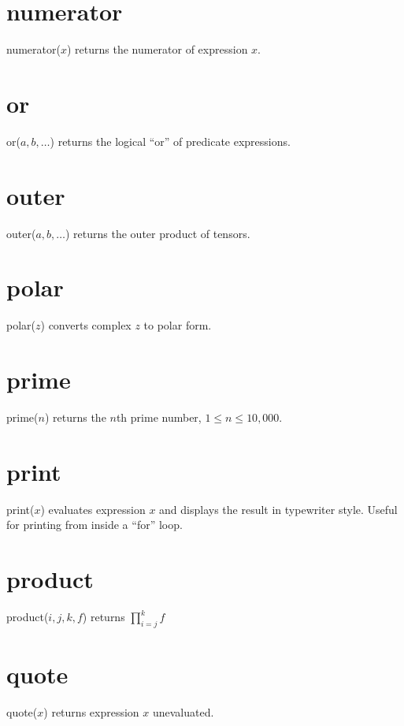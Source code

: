 \documentclass[12pt,openany]{report}
\begin{document}
\section*{numerator}
numerator($x$) returns the numerator of expression $x$.

\section*{or}
or($a,b,\ldots$) returns the logical ``or'' of predicate expressions.

\section*{outer}
outer($a,b,\ldots$) returns the outer product of tensors.

\section*{polar}
polar($z$) converts complex $z$ to polar form.

\section*{prime}
prime($n$) returns the $n$th prime number, $1\le n\le10{,}000$.

\section*{print}
print($x$) evaluates expression $x$ and displays the result in typewriter style.
Useful for printing from inside a ``for'' loop.

\section*{product}
product($i,j,k,f$) returns $\displaystyle\prod_{i=j}^k f$

\section*{quote}
quote($x$) returns expression $x$ unevaluated.
\end{document}
